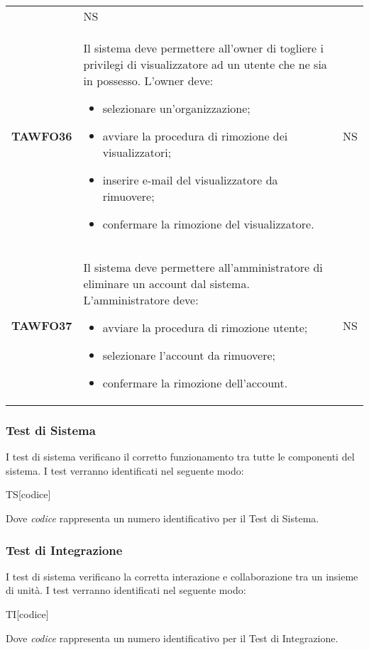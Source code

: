 \documentclass[../piano-di-qualifica.tex]{subfiles}
\begin{document}
\begin{centering}
\begin{longtable}[H]{>{\centering\bfseries}m{3cm} >{}p{10cm} >{\centering\arraybackslash}m{3cm}}
\begin{itemize}
        \end{itemize}
        & NS \\
        TAWFO36      & Il sistema deve permettere all’owner di togliere i privilegi di visualizzatore ad un utente che ne sia in possesso. \newline
        L'owner deve:
        \begin{itemize}
         \item selezionare un'organizzazione;
         \item avviare la procedura di rimozione dei visualizzatori;
         \item inserire e-mail del visualizzatore da rimuovere;
         \item confermare la rimozione del visualizzatore.
        \end{itemize}
        & NS \\
        TAWFO37      & Il sistema deve permettere all’amministratore di eliminare un account dal sistema. \newline
        L'amministratore deve:
        \begin{itemize}
         \item avviare la procedura di rimozione utente;
         \item selezionare l'account da rimuovere;
         \item confermare la rimozione dell'account.
        \end{itemize}
        & NS \\


      \end{longtable}
    \end{centering}
    \subsubsection{Test di Sistema}%
  \label{subs:sistema}
    I test di sistema verificano il corretto funzionamento tra tutte le componenti del sistema. I test verranno identificati nel seguente modo:
    \begin{center}
      TS[codice]
    \end{center}
    Dove \textit{codice} rappresenta un numero identificativo per il Test di Sistema.
  \subsubsection{Test di Integrazione}%
  \label{subs:integrazione}
    I test di sistema verificano la corretta interazione e collaborazione tra un insieme di unità. I test verranno identificati nel seguente modo:
    \begin{center}
      TI[codice]
    \end{center}
    Dove \textit{codice} rappresenta un numero identificativo per il Test di Integrazione.
\end{document}
